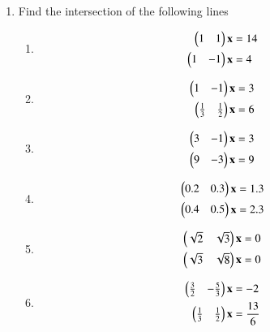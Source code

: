 \begin{enumerate}[label=\arabic*.,ref=\thesubsection.\theenumi]
\begin{enumerate}[itemsep=2pt]
\end{enumerate}
%
%
\item Find the intersection of the following lines
%
\begin{enumerate}[itemsep=2pt]
\item
\begin{align}
\begin{split}
\begin{pmatrix}1 & 1 \end{pmatrix}\mathbf{x}&=14
\\
\begin{pmatrix}1 & -1 \end{pmatrix}\mathbf{x}&=4
\end{split}
\end{align}
\item
\begin{align}
\begin{split}
\begin{pmatrix}1 & -1 \end{pmatrix}\mathbf{x}&=3
\\
\begin{pmatrix}\frac{1}{3} & \frac{1}{2} \end{pmatrix}\mathbf{x}&=6
\end{split}
\end{align}
\item
\begin{align}
\begin{split}
\begin{pmatrix}3 & -1 \end{pmatrix}\mathbf{x}&=3
\\
\begin{pmatrix}9 & -3 \end{pmatrix}\mathbf{x}&=9
\end{split}
\end{align}
\item
\begin{align}
\begin{split}
\begin{pmatrix}0.2 & 0.3 \end{pmatrix}\mathbf{x}&=1.3
\\
\begin{pmatrix}0.4 & 0.5 \end{pmatrix}\mathbf{x}&=2.3
\end{split}
\end{align}
\item
\begin{align}
\begin{split}
\begin{pmatrix}\sqrt{2} & \sqrt{3} \end{pmatrix}\mathbf{x}&=0
\\
\begin{pmatrix}\sqrt{3} & \sqrt{8} \end{pmatrix}\mathbf{x}&=0
\end{split}
\end{align}
\item
\begin{align}
\begin{split}
\begin{pmatrix}\frac{3}{2} & -\frac{5}{3} \end{pmatrix}\mathbf{x}&=-2
\\
\begin{pmatrix}\frac{1}{3} & \frac{1}{2} \end{pmatrix}\mathbf{x}&=\frac{13}{6}
\end{split}
\end{align}
\end{enumerate}

\end{enumerate}
